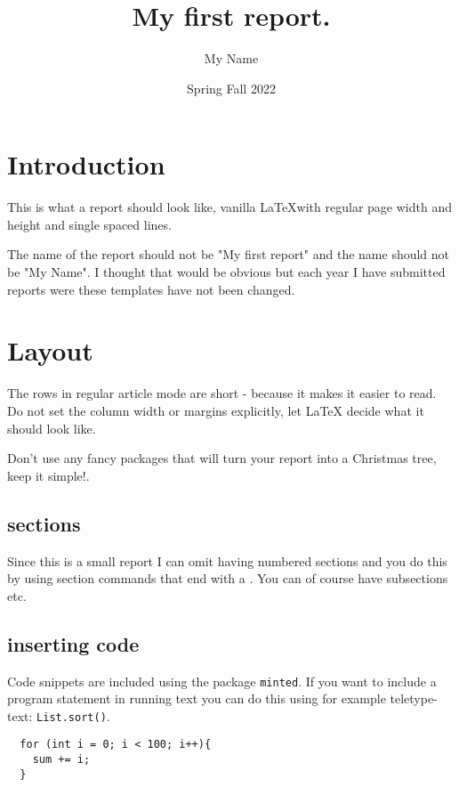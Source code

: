 \documentclass[a4paper,11pt]{article}
\begin{document}
\title{
    \textbf{My first report.}
}
\author{My Name}
\date{Spring Fall 2022}

\maketitle

\section*{Introduction}

This is what a report should look like, vanilla \LaTeX with regular
page width and height and single spaced lines. 

The name of the report should not be "My first report" and the name
should not be "My Name". I thought that would be obvious but each year
I have submitted reports were these templates have not been changed. 

\section*{Layout}

The rows in regular article mode are short - because it makes it
easier to read. Do not set the column width or margins explicitly, let
LaTeX decide what it should look like.

Don't use any fancy packages that will turn your report into a
Christmas tree, keep it simple!.

\subsection*{sections}

Since this is a small report I can omit having numbered sections and
you do this by using section commands that end with a {\tt *}. You can
of course have subsections etc. 


\subsection*{inserting code}

Code snippets are included using the package {\tt minted}. If you
want to include a program statement in running text you can do this
using for example teletype-text: {\tt List.sort()}.

\begin{verbatim}
  for (int i = 0; i < 100; i++){
    sum += i;
  }
\end{verbatim}
\end{document}
